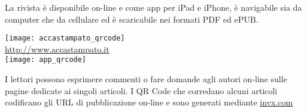 
La rivista è disponibile on-line e come app per iPad e iPhone, è navigabile sia da computer che da cellulare ed è scaricabile nei formati PDF ed ePUB.
\begin{center}
\texttt{[image: accastampato\_qrcode]}\\
\url{http://www.accastampato.it}\\
\bigskip
\texttt{[image: app\_qrcode]}\\
\end{center}


\bigskip
I lettori possono esprimere commenti o fare domande agli autori on-line sulle pagine dedicate ai singoli articoli.
I QR Code che corredano alcuni articoli codificano gli URL di pubblicazione on-line e sono generati mediante \url{invx.com}



% 

